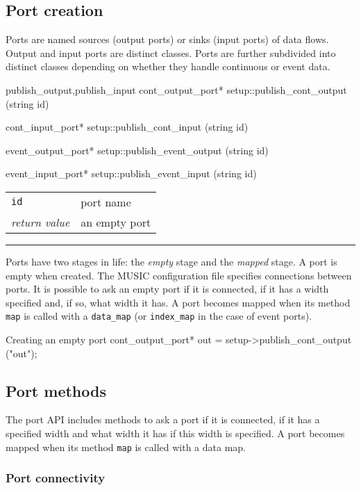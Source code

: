 \documentclass[a4paper]{report}
\makeatletter
\newenvironment{parameters}%
{\begin{tabular}{@{\hspace{2em}}lp{0.6\textwidth}}}%
{\end{tabular}\par\vspace{1mm}\par\hrule\par\vspace{5mm}}
\makeatother
\begin{document}
\pagebreak
\subsection{Port creation}

Ports are named sources (output ports) or sinks (input
ports) of data flows.  Output and input ports are distinct classes.
Ports are further subdivided into distinct classes depending on
whether they handle continuous or event data.

\begin{head}{publish_output,publish_input}
  cont_output_port* setup::publish_cont_output (string id)

  cont_input_port* setup::publish_cont_input (string id)

  event_output_port* setup::publish_event_output (string id)

  event_input_port* setup::publish_event_input (string id)
\end{head}
\begin{parameters}
  \lstinline|id| & port name \\
  \emph{return value} & an empty port \\
\end{parameters}

Ports have two stages in life: the \emph{empty} stage and the
\emph{mapped} stage.  A port is empty when created.  The MUSIC
configuration file specifies connections between ports.  It is
possible to ask an empty port if it is connected, if it has a width
specified and, if so, what width it has.  A port becomes mapped when
its method \lstinline|map| is called with a \lstinline|data_map| (or
\lstinline|index_map| in the case of event ports).

\begin{code}{Creating an empty port}
cont_output_port* out =
   setup->publish_cont_output ("out");
\end{code}

\subsection{Port methods}

The port API includes methods to ask a port if it is connected, if it
has a specified width and what width it has if this width is
specified.  A port becomes mapped when its method \lstinline|map| is
called with a data map.

\subsubsection{Port connectivity}
\end{document}
